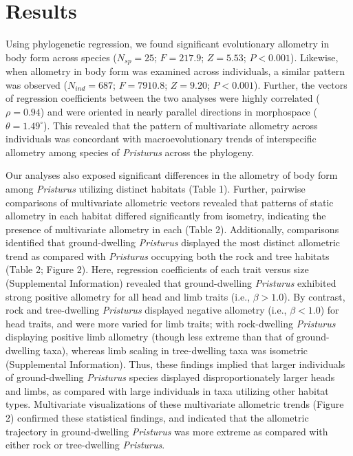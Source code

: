 \documentclass[
  11pt,
]{article}
\begin{document}
\hypertarget{results}{%
\section{Results}\label{results}}

Using phylogenetic regression, we found significant evolutionary
allometry in body form across species (\(N_{sp}=25\); \(F = 217.9\);
\(Z =5.53\); \(P < 0.001\)). Likewise, when allometry in body form was
examined across individuals, a similar pattern was observed
(\(N_{ind}=687\); \(F = 7910.8\); \(Z =9.20\); \(P < 0.001\)). Further,
the vectors of regression coefficients between the two analyses were
highly correlated (\(\rho = 0.94\)) and were oriented in nearly parallel
directions in morphospace (\(\theta = 1.49^\circ\)). This revealed that
the pattern of multivariate allometry across individuals was concordant
with macroevolutionary trends of interspecific allometry among species
of \emph{Pristurus} across the phylogeny. \hfill\break

Our analyses also exposed significant differences in the allometry of
body form among \emph{Pristurus} utilizing distinct habitats (Table 1).
Further, pairwise comparisons of multivariate allometric vectors
revealed that patterns of static allometry in each habitat differed
significantly from isometry, indicating the presence of multivariate
allometry in each (Table 2). Additionally, comparisons identified that
ground-dwelling \emph{Pristurus} displayed the most distinct allometric
trend as compared with \emph{Pristurus} occupying both the rock and tree
habitats (Table 2; Figure 2). Here, regression coefficients of each
trait versus size (Supplemental Information) revealed that
ground-dwelling \emph{Pristurus} exhibited strong positive allometry for
all head and limb traits (i.e., \(\beta>1.0\)). By contrast, rock and
tree-dwelling \emph{Pristurus} displayed negative allometry (i.e.,
\(\beta < 1.0\)) for head traits, and were more varied for limb traits;
with rock-dwelling \emph{Pristurus} displaying positive limb allometry
(though less extreme than that of ground-dwelling taxa), whereas limb
scaling in tree-dwelling taxa was isometric (Supplemental Information).
Thus, these findings implied that larger individuals of ground-dwelling
\emph{Pristurus} species displayed disproportionately larger heads and
limbs, as compared with large individuals in taxa utilizing other
habitat types. Multivariate visualizations of these multivariate
allometric trends (Figure 2) confirmed these statistical findings, and
indicated that the allometric trajectory in ground-dwelling
\emph{Pristurus} was more extreme as compared with either rock or
tree-dwelling \emph{Pristurus}. \hfill\break
\end{document}
